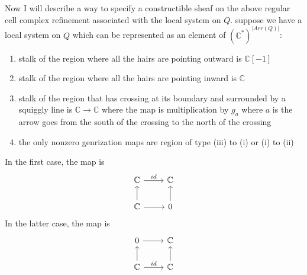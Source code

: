 Now I will describe a way to specify a constructible sheaf on the above regular cell complex refinement associated with the local system on $Q$. suppose we have a local system on $Q$ which can be represented as an element of $(\mathbb{C}^*)^{|Arr(Q)|}$:
\begin{enumerate}[label= (\roman*)]
\item stalk of the region where all the hairs are pointing outward is $\mathbb{C}[-1]$
\item stalk of the region where all the hairs are pointing inward is $\mathbb{C}$
\item stalk of the region that has crossing at its boundary and surrounded by a squiggly line is $\mathbb{C}\rightarrow\mathbb{C}$ where the map is multiplication by $g_a$ where $a$ is the arrow goes from the south of the crossing to the north of the crossing
\item the only nonzero genrization maps are region of type (\Rn{3}) to (\Rn{1}) or (\Rn{1}) to (\Rn{2})
\end{enumerate}

In the first case, the map is
\[
  \begin{tikzcd}
    \mathbb{C} \arrow{r}{id} & \mathbb{C} \\
    \mathbb{C}\arrow{u}{} \arrow{r}{}& 0\arrow{u}{}
  \end{tikzcd}
\]
In the latter case, the map is 
\[
  \begin{tikzcd}
	0 \arrow{r}{} & \mathbb{C} \\
    \mathbb{C}\arrow{u}{} \arrow{r}{id}& \mathbb{C}\arrow{u}{}
  \end{tikzcd}
\]

